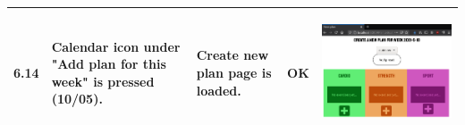 \documentclass[12pt,twoside,titlepage,a4paper]{article}
\theoremstyle{definicion}
\theoremstyle{lema}
\theoremstyle{teorema}
\theoremstyle{corolario}
\theoremstyle{ejemplo}
\theoremstyle{nota}
\begin{document}
\begin{table}[!h]
\begin{tabular}{|m{0.6cm}|m{2.9cm}|m{3.6cm}|m{1.1cm}|m{5.9cm}|}
		\hline
		6.14 & Calendar icon under "Add plan for this week" is pressed (10/05). & Create new plan page is loaded. & OK &
		\begin{center}\includegraphics[scale=0.22]{newplan1.png}\end{center} \\
		\hline
	\end{tabular}
\end{table}
\newpage
\end{document}
